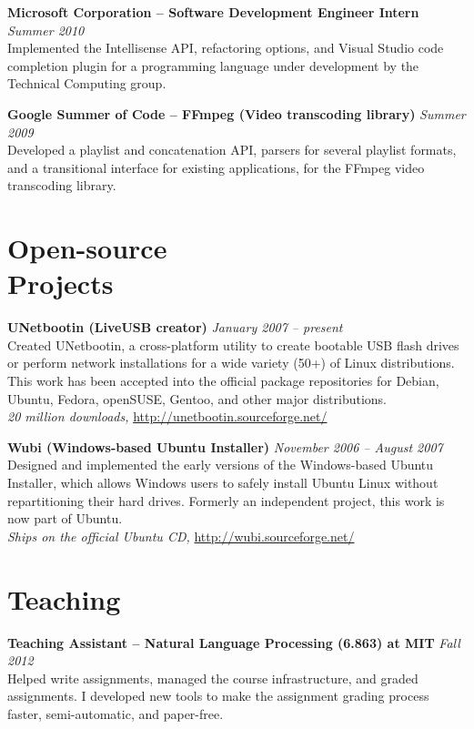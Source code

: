 \documentclass[margin,line]{resume}
\begin{document}
\begin{resume}
\textbf{Microsoft Corporation -- Software Development Engineer Intern} \hfill \textsl{Summer 2010}\\
Implemented the Intellisense API, refactoring options, and Visual Studio code completion plugin for a programming language under development by the Technical Computing group.

\textbf{Google Summer of Code -- FFmpeg (Video transcoding library)} \hfill \textsl{Summer 2009}\\
Developed a playlist and concatenation API, parsers for several playlist formats, and a transitional interface for existing applications, for the FFmpeg video transcoding library.

\section{\mysidestyle Open-source\\Projects}

\textbf{UNetbootin (LiveUSB creator)} \hfill \textsl{January 2007 -- present}\\
Created UNetbootin, a cross-platform utility to create bootable USB flash drives or perform network installations for a wide variety (50+) of Linux distributions. This work has been accepted into the official package repositories for Debian, Ubuntu, Fedora, openSUSE, Gentoo, and other major distributions. \\
\emph{20 million downloads,} \url{http://unetbootin.sourceforge.net/}

\textbf{Wubi (Windows-based Ubuntu Installer)} \hfill \textsl{November 2006 -- August 2007}\\
Designed and implemented the early versions of the Windows-based Ubuntu Installer, which allows Windows users to safely install Ubuntu Linux without repartitioning their hard drives. Formerly an independent project, this work is now part of Ubuntu. \\
\emph{Ships on the official Ubuntu CD,} \url{http://wubi.sourceforge.net/}

\pagebreak

\section{\mysidestyle Teaching}

\textbf{Teaching Assistant -- Natural Language Processing (6.863) at MIT} \hfill \textsl{Fall 2012} \\
Helped write assignments, managed the course infrastructure, and graded assignments. I developed new tools to make the assignment grading process faster, semi-automatic, and paper-free.


\end{resume}
\end{document}
